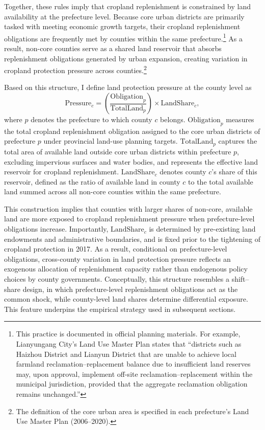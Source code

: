 Together, these rules imply that cropland replenishment is constrained by land availability at the prefecture level. Because core urban districts are primarily tasked with meeting economic growth targets, their cropland replenishment obligations are frequently met by counties within the same prefecture.\footnote{This practice is documented in official planning materials. For example, Lianyungang City’s Land Use Master Plan states that “districts such as Haizhou District and Lianyun District that are unable to achieve local farmland reclamation–replacement balance due to insufficient land reserves may, upon approval, implement off-site reclamation–replacement within the municipal jurisdiction, provided that the aggregate reclamation obligation remains unchanged.”} As a result, non-core counties serve as a shared land reservoir that absorbs replenishment obligations generated by urban expansion, creating variation in cropland protection pressure across counties.\footnote{The definition of the core urban area is specified in each prefecture’s Land Use Master Plan (2006–2020).}


Based on this structure, I define land protection pressure at the county level as
\begin{equation}
\text{Pressure}_{c}
=
\left(
\frac{\text{Obligation}_{p}}
     {\text{TotalLand}_{p}}
\right)
\times 
\text{LandShare}_{c},
\end{equation}
where $p$ denotes the prefecture to which county $c$ belongs. $\text{Obligation}_{p}$ measures the total cropland replenishment obligation assigned to the core urban districts of prefecture $p$ under provincial land-use planning targets. $\text{TotalLand}_{p}$ captures the total area of available land outside core urban districts within prefecture $p$, excluding impervious surfaces and water bodies, and represents the effective land reservoir for cropland replenishment. $\text{LandShare}_{c}$ denotes county $c$’s share of this reservoir, defined as the ratio of available land in county $c$ to the total available land summed across all non-core counties within the same prefecture.

This construction implies that counties with larger shares of non-core, available land are more exposed to cropland replenishment pressure when prefecture-level obligations increase. Importantly, $\text{LandShare}_{c}$ is determined by pre-existing land endowments and administrative boundaries, and is fixed prior to the tightening of cropland protection in 2017. As a result, conditional on prefecture-level obligations, cross-county variation in land protection pressure reflects an exogenous allocation of replenishment capacity rather than endogenous policy choices by county governments. Conceptually, this structure resembles a shift–share design, in which prefecture-level replenishment obligations act as the common shock, while county-level land shares determine differential exposure. This feature underpins the empirical strategy used in subsequent sections.

